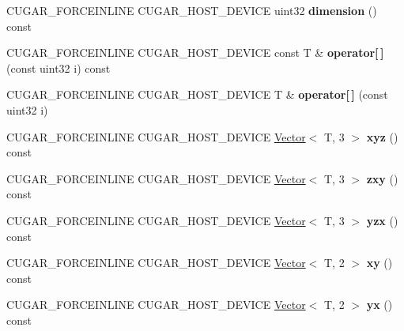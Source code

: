 \begin{DoxyCompactItemize}
C\+U\+G\+A\+R\+\_\+\+F\+O\+R\+C\+E\+I\+N\+L\+I\+NE C\+U\+G\+A\+R\+\_\+\+H\+O\+S\+T\+\_\+\+D\+E\+V\+I\+CE uint32 {\bfseries dimension} () const
\item 
\mbox{\label{structcugar_1_1_vector_3_01_t_00_014_01_4_a21f34facf1db1ae9c57f5af36491b548}} 
C\+U\+G\+A\+R\+\_\+\+F\+O\+R\+C\+E\+I\+N\+L\+I\+NE C\+U\+G\+A\+R\+\_\+\+H\+O\+S\+T\+\_\+\+D\+E\+V\+I\+CE const T \& {\bfseries operator\mbox{[}$\,$\mbox{]}} (const uint32 i) const
\item 
\mbox{\label{structcugar_1_1_vector_3_01_t_00_014_01_4_ad99023562992e2efe169526ed3b24a80}} 
C\+U\+G\+A\+R\+\_\+\+F\+O\+R\+C\+E\+I\+N\+L\+I\+NE C\+U\+G\+A\+R\+\_\+\+H\+O\+S\+T\+\_\+\+D\+E\+V\+I\+CE T \& {\bfseries operator\mbox{[}$\,$\mbox{]}} (const uint32 i)
\item 
\mbox{\label{structcugar_1_1_vector_3_01_t_00_014_01_4_a4e8b60378d921bf61010816548391568}} 
C\+U\+G\+A\+R\+\_\+\+F\+O\+R\+C\+E\+I\+N\+L\+I\+NE C\+U\+G\+A\+R\+\_\+\+H\+O\+S\+T\+\_\+\+D\+E\+V\+I\+CE \hyperlink{structcugar_1_1_vector}{Vector}$<$ T, 3 $>$ {\bfseries xyz} () const
\item 
\mbox{\label{structcugar_1_1_vector_3_01_t_00_014_01_4_abf2e4970e063873974d6e48066efcd9a}} 
C\+U\+G\+A\+R\+\_\+\+F\+O\+R\+C\+E\+I\+N\+L\+I\+NE C\+U\+G\+A\+R\+\_\+\+H\+O\+S\+T\+\_\+\+D\+E\+V\+I\+CE \hyperlink{structcugar_1_1_vector}{Vector}$<$ T, 3 $>$ {\bfseries zxy} () const
\item 
\mbox{\label{structcugar_1_1_vector_3_01_t_00_014_01_4_ad26566aacf1decca4088200f3ee3a979}} 
C\+U\+G\+A\+R\+\_\+\+F\+O\+R\+C\+E\+I\+N\+L\+I\+NE C\+U\+G\+A\+R\+\_\+\+H\+O\+S\+T\+\_\+\+D\+E\+V\+I\+CE \hyperlink{structcugar_1_1_vector}{Vector}$<$ T, 3 $>$ {\bfseries yzx} () const
\item 
\mbox{\label{structcugar_1_1_vector_3_01_t_00_014_01_4_aa941d9bc8e6ca18f77f619a0386e060d}} 
C\+U\+G\+A\+R\+\_\+\+F\+O\+R\+C\+E\+I\+N\+L\+I\+NE C\+U\+G\+A\+R\+\_\+\+H\+O\+S\+T\+\_\+\+D\+E\+V\+I\+CE \hyperlink{structcugar_1_1_vector}{Vector}$<$ T, 2 $>$ {\bfseries xy} () const
\item 
\mbox{\label{structcugar_1_1_vector_3_01_t_00_014_01_4_abecf0aa198559181f94f3609a88cd8ff}} 
C\+U\+G\+A\+R\+\_\+\+F\+O\+R\+C\+E\+I\+N\+L\+I\+NE C\+U\+G\+A\+R\+\_\+\+H\+O\+S\+T\+\_\+\+D\+E\+V\+I\+CE \hyperlink{structcugar_1_1_vector}{Vector}$<$ T, 2 $>$ {\bfseries yx} () const
\end{DoxyCompactItemize}
